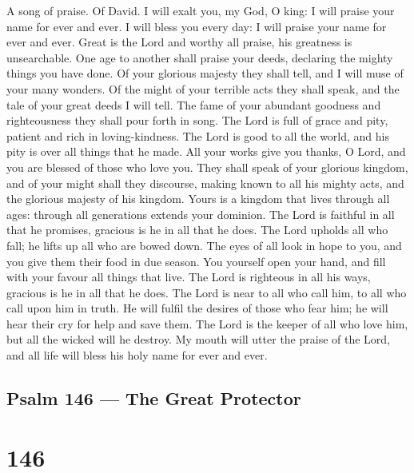 A song of praise. Of David.  I will exalt you, my God, O
king: I will praise your name for ever and ever.  I will
bless you every day: I will praise your name for ever and ever.
 Great is the Lord and worthy all praise, his greatness is
unsearchable.  One age to another shall praise your deeds,
declaring the mighty things you have done.  Of your glorious
majesty they shall tell, and I will muse of your many wonders.
 Of the might of your terrible acts they shall speak, and
the tale of your great deeds I will tell.  The fame of your
abundant goodness and righteousness they shall pour forth in song.
 The Lord is full of grace and pity, patient and rich in
loving-kindness.  The Lord is good to all the world, and his
pity is over all things that he made.  All your works give
you thanks, O Lord, and you are blessed of those who love you.
 They shall speak of your glorious kingdom, and of your
might shall they discourse,  making known to all his mighty
acts, and the glorious majesty of his kingdom.  Yours is a
kingdom that lives through all ages: through all generations extends
your dominion. The Lord is faithful in all that he promises, gracious is
he in all that he does.  The Lord upholds all who fall; he
lifts up all who are bowed down.  The eyes of all look in
hope to you, and you give them their food in due season. 
You yourself open your hand, and fill with your favour all things that
live.  The Lord is righteous in all his ways, gracious is
he in all that he does.  The Lord is near to all who call
him, to all who call upon him in truth.  He will fulfil the
desires of those who fear him; he will hear their cry for help and save
them.  The Lord is the keeper of all who love him, but all
the wicked will he destroy.  My mouth will utter the praise
of the Lord, and all life will bless his holy name for ever and ever.

\hypertarget{psalm-146-the-great-protector}{%
\subsection{Psalm 146 --- The Great
Protector}\label{psalm-146-the-great-protector}}

\hypertarget{section-145}{%
\section{146}\label{section-145}}


